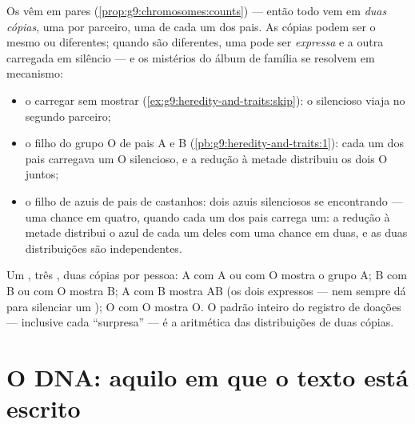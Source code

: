 \begin{proposition}\label{prop:g9:genes-and-dna:twocopies}
Os  vêm em pares
(\cref{prop:g9:chromosomes:counts}) --- então todo  vem
em \emph{duas cópias}, uma por parceiro, uma de cada um dos
pais. As cópias podem ser o mesmo  ou  diferentes;
quando são diferentes, uma pode ser \emph{expressa} e a outra
carregada em silêncio --- e os mistérios do álbum de família
se resolvem em mecanismo:
\begin{itemize}
  \item o carregar sem mostrar
        (\cref{ex:g9:heredity-and-traits:skip}): o 
        silencioso viaja no segundo parceiro;
  \item o filho do grupo O de pais A e B
        (\cref{pb:g9:heredity-and-traits:1}): cada um dos
        pais carregava um O silencioso, e a redução à metade
        distribuiu os dois O juntos;
  \item o filho de  azuis de pais de  castanhos:
        dois azuis silenciosos se encontrando --- uma chance
        em quatro, quando cada um dos pais carrega um: a
        redução à metade distribui o azul de cada um deles
        com uma chance em duas, e as duas distribuições são
        independentes.
\end{itemize}
\end{proposition}
\admitted

\begin{example}\label{ex:g9:genes-and-dna:bloodgroups}
Um , três , duas cópias por pessoa: A com A ou com
O mostra o grupo A; B com B ou com O mostra B; A com B
mostra AB (os dois expressos --- nem sempre dá para silenciar
um ); O com O mostra O. O padrão inteiro do registro de
doações --- inclusive cada ``surpresa'' --- é a aritmética
das distribuições de duas cópias.
\end{example}

\section{O DNA: aquilo em que o texto está escrito}

